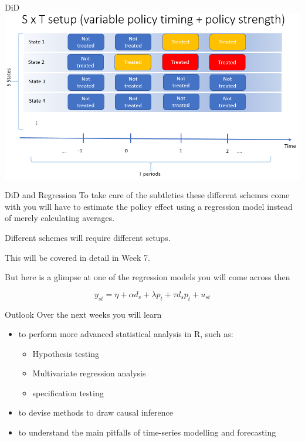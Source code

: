 \documentclass[
  ignorenonframetext,
]{beamer}
\begin{document}
\begin{frame}{DiD}
\protect\hypertarget{did-5}{}
\includegraphics{2xTslide4.PNG}
\end{frame}

\begin{frame}{DiD and Regression}
\protect\hypertarget{did-and-regression}{}
To take care of the subtleties these different schemes come with you
will have to estimate the policy effect using a regression model instead
of merely calculating averages.

Different schemes will require different setups.

This will be covered in detail in Week 7.

But here is a glimpse at one of the regression models you will come
across then

\[y_{st}=\eta + \alpha d_s + \lambda p_t + \tau d_s p_t + u_{st}\]
\end{frame}

\begin{frame}{Outlook}
\protect\hypertarget{outlook}{}
Over the next weeks you will learn

\begin{itemize}
  \item to perform more advanced statistical analysis in R, such as:
      \begin{itemize}
        \item Hypothesis testing
        \item Multivariate regression analysis
        \item specification testing
      \end{itemize}
  \item to devise methods to draw causal inference
  \item to understand the main pitfalls of time-series modelling and forecasting
\end{itemize}
\end{frame}
\end{document}
